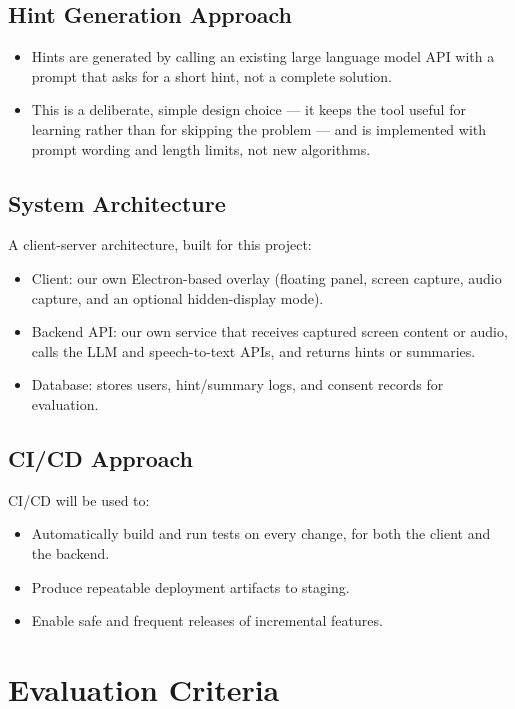 \documentclass[11pt]{article}
\begin{document}
\subsection{Hint Generation Approach}
\begin{itemize}
  \item Hints are generated by calling an existing large language model API with a prompt
    that asks for a short hint, not a complete solution.
  \item This is a deliberate, simple design choice --- it keeps the tool useful for learning
    rather than for skipping the problem --- and is implemented with prompt wording and
    length limits, not new algorithms.
\end{itemize}

\subsection{System Architecture}
A client-server architecture, built for this project:
\begin{itemize}
  \item Client: our own Electron-based overlay (floating panel, screen capture, audio
    capture, and an optional hidden-display mode).
  \item Backend API: our own service that receives captured screen content or audio, calls
    the LLM and speech-to-text APIs, and returns hints or summaries.
  \item Database: stores users, hint/summary logs, and consent records for evaluation.
\end{itemize}

\subsection{CI/CD Approach}
CI/CD will be used to:
\begin{itemize}
  \item Automatically build and run tests on every change, for both the client and the
    backend.
  \item Produce repeatable deployment artifacts to staging.
  \item Enable safe and frequent releases of incremental features.
\end{itemize}

\section{Evaluation Criteria}
\end{document}
